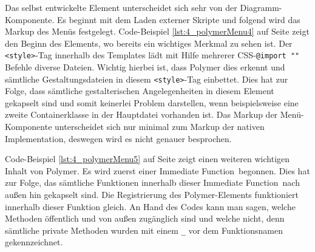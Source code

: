 Das selbst entwickelte Element unterscheidet sich sehr von der Diagramm-Komponente. Es beginnt mit dem Laden externer Skripte und folgend wird das Markup des Menüs festgelegt. Code-Beispiel \ref{lst:4_polymerMenu4} auf Seite \pageref{lst:4_polymerMenu4} zeigt den Beginn des Elements, wo bereits ein wichtiges Merkmal zu sehen ist. Der \lstinline|<style>|-Tag innerhalb des Templates lädt mit Hilfe mehrerer CSS-\lstinline|@import ""| Befehle diverse Dateien. Wichtig hierbei ist, dass Polymer dies erkennt und sämtliche Gestaltungsdateien in diesem \lstinline|<style>|-Tag einbettet. Dies hat zur Folge, dass sämtliche gestalterischen Angelegenheiten in diesem Element gekapselt sind und somit keinerlei Problem darstellen, wenn beispielsweise eine zweite Containerklasse in der Hauptdatei vorhanden ist. Das Markup der Menü-Komponente unterscheidet sich nur minimal zum Markup der nativen Implementation, deswegen wird es nicht genauer besprochen.

Code-Beispiel \ref{lst:4_polymerMenu5} auf Seite \pageref{lst:4_polymerMenu5} zeigt einen weiteren wichtigen Inhalt von Polymer. Es wird zuerst einer \glqq Immediate Function\grqq\ begonnen. Dies hat zur Folge, das sämtliche Funktionen innerhalb dieser \glqq Immediate Function\grqq\ nach außen hin gekapselt sind. Die Registrierung des Polymer-Elements funktioniert innerhalb dieser Funktion gleich. An Hand des Codes kann man sagen, welche Methoden öffentlich und von außen zugänglich sind und welche nicht, denn sämtliche private Methoden wurden mit einem \lstinline|_| vor dem Funktionsnamen gekennzeichnet.





